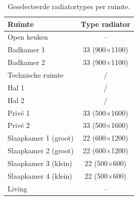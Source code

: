 \documentclass[a4paper,12pt]{article}
\begin{document}
\begin{table}[H]
\centering
\small
\caption{Geselecteerde radiatortypes per ruimte.}
\label{tab:radiatortypes}

\begin{tabularx}{0.7\textwidth}{X c}
\toprule
\rowcolor{gray!20}
\textbf{Ruimte} & \textbf{Type radiator} \\
\midrule

Open keuken & -- \\

Badkamer 1 & 33 (900$\times$1100) \\

Badkamer 2 & 33 (900$\times$1100) \\

Technische ruimte & / \\

Hal 1 & / \\

Hal 2 & / \\

Privé 1 & 33 (500$\times$1600) \\

Privé 2 & 33 (500$\times$1600) \\

Slaapkamer 1 (groot) & 22 (600$\times$1200) \\

Slaapkamer 2 (groot) & 22 (600$\times$1200) \\

Slaapkamer 3 (klein) & 22 (500$\times$600) \\

Slaapkamer 4 (klein) & 22 (500$\times$600) \\

Living & -- \\

\bottomrule
\end{tabularx}
\end{table}
\end{document}
